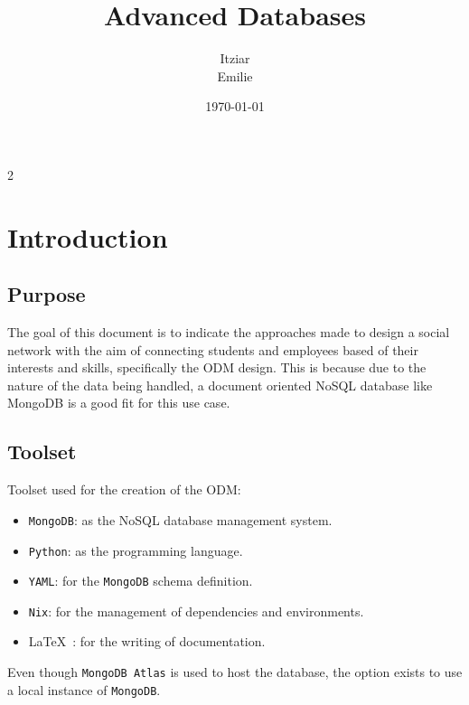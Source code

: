 \documentclass[english]{article}
\title{Advanced Databases}
\author{Itziar \\ Emilie}
\date{\today}
\begin{document}
\maketitle

\begin{multicols}{2}
	\tableofcontents
\end{multicols}



\section{Introduction}

\subsection{Purpose}

\par
The goal of this document is to indicate the approaches made to design a social
network with the aim of connecting students and employees based of their
interests and skills, specifically the ODM design. This is because due to the
nature of the data being handled, a document oriented NoSQL database like
MongoDB is a good fit for this use case.

\subsection{Toolset}

\par
Toolset used for the creation of the ODM:

\begin{itemize}
	\item \texttt{MongoDB}: as the NoSQL database management system.
	\item \texttt{Python}: as the programming language.
	\item \texttt{YAML}: for the \texttt{MongoDB} schema definition.
	\item \texttt{Nix}: for the management of dependencies and environments.
	\item \protect\LaTeX\ : for the writing of documentation.
\end{itemize}

\par
Even though \texttt{MongoDB Atlas} is used to host the database, the option
exists to use a local instance of \texttt{MongoDB}.
\end{document}
